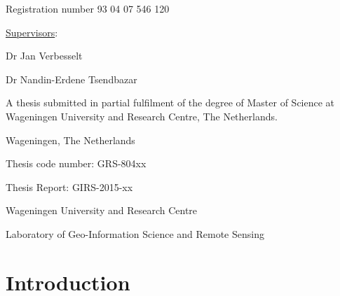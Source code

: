 \documentclass[a4paper,12pt]{scrbook}
\begin{document}
\begin{titlingpage}
  \newpage %
  \thispagestyle{empty}
  
  \centering

  {\bfseries \Large \thetitle} \vspace{2.7cm}
  
  {\Large \theauthor} \vspace{1.1cm}
  
  {Registration number 93 04 07 546 120} \vspace{3.5cm}
  
  {\large \underline{Supervisors}:} \vspace{1.1cm}
  
  {Dr Jan Verbesselt}
  
  {Dr Nandin-Erdene Tsendbazar} \vspace{3.0cm}
  
  {A thesis submitted in partial fulfilment of the degree of Master of Science at Wageningen University and Research Centre, The Netherlands.} \vspace{3.7cm}
  
  \begin{flushright}
    {\thedate}
  
    {Wageningen, The Netherlands}
  \end{flushright} \vspace{0.5cm}

  \begin{flushleft}
    Thesis code number: GRS-804xx
  
    Thesis Report: GIRS-2015-xx
  
    Wageningen University and Research Centre
  
    Laboratory of Geo-Information Science and Remote Sensing 
  \end{flushleft}
\end{titlingpage}

\setcounter{page}{3}

\chapter{Introduction}
\end{document}
